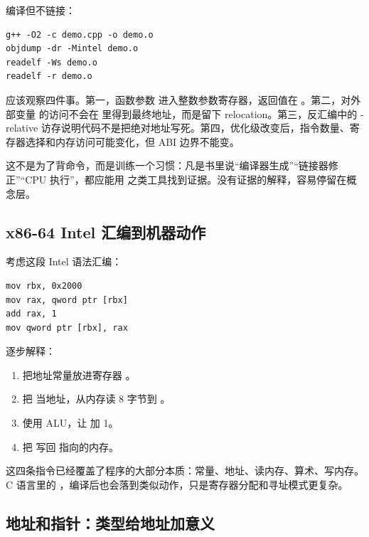 编译但不链接：

\begin{lstlisting}
g++ -O2 -c demo.cpp -o demo.o
objdump -dr -Mintel demo.o
readelf -Ws demo.o
readelf -r demo.o
\end{lstlisting}

应该观察四件事。第一，函数参数  进入整数参数寄存器，返回值在 。第二，对外部变量  的访问不会在  里得到最终地址，而是留下 relocation。第三，反汇编中的 -relative 访存说明代码不是把绝对地址写死。第四，优化级改变后，指令数量、寄存器选择和内存访问可能变化，但 ABI 边界不能变。

\begin{rubricbox}
这不是为了背命令，而是训练一个习惯：凡是书里说“编译器生成”“链接器修正”“CPU 执行”，都应能用  之类工具找到证据。没有证据的解释，容易停留在概念层。
\end{rubricbox}

\subsection{x86-64 Intel 汇编到机器动作}

考虑这段 Intel 语法汇编：

\begin{lstlisting}
mov rbx, 0x2000
mov rax, qword ptr [rbx]
add rax, 1
mov qword ptr [rbx], rax
\end{lstlisting}

逐步解释：

\begin{enumerate}
\tightlist
\item {} 把地址常量放进寄存器 。
\item {} 把  当地址，从内存读 8 字节到 。
\item {} 使用 ALU，让  加 1。
\item {} 把  写回  指向的内存。
\end{enumerate}

这四条指令已经覆盖了程序的大部分本质：常量、地址、读内存、算术、写内存。C 语言里的 ，编译后也会落到类似动作，只是寄存器分配和寻址模式更复杂。

\subsection{地址和指针：类型给地址加意义}

